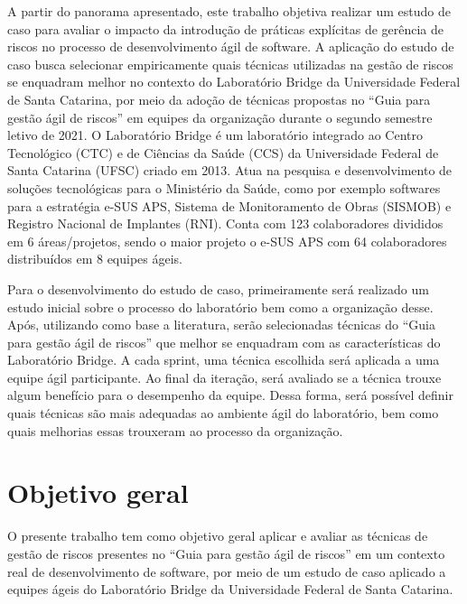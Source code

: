 \documentclass[
    12pt,       %
    openright,      %
    twoside,      %
    a4paper,      %
    english,      %
    french,       %
    spanish,      %
    brazil,       %
    ]{abntex2}
\begin{document}
A partir do panorama apresentado, este trabalho objetiva realizar um estudo de caso para avaliar o impacto da introdução de práticas explícitas de gerência de riscos no processo de desenvolvimento ágil de software. A aplicação do estudo de caso busca selecionar empiricamente quais técnicas utilizadas na gestão de riscos se enquadram melhor no contexto do Laboratório Bridge da Universidade Federal de Santa Catarina, por meio da adoção de técnicas propostas no “Guia para gestão ágil de riscos” \cite{Vieira:2020} em equipes da organização durante o segundo semestre letivo de 2021. O Laboratório Bridge é um laboratório integrado ao Centro Tecnológico (CTC) e de Ciências da Saúde (CCS) da Universidade Federal de Santa Catarina (UFSC) criado em 2013. Atua na pesquisa e desenvolvimento de soluções tecnológicas para o Ministério da Saúde, como por exemplo softwares para a estratégia e-SUS APS, Sistema de Monitoramento de Obras (SISMOB) e Registro Nacional de Implantes (RNI). Conta com 123 colaboradores divididos em 6 áreas/projetos, sendo o maior projeto o e-SUS APS com 64 colaboradores distribuídos em 8 equipes ágeis.

Para o desenvolvimento do estudo de caso, primeiramente será realizado um estudo inicial sobre o processo do laboratório bem como a organização desse. Após, utilizando como base a literatura, serão selecionadas técnicas do “Guia para gestão ágil de riscos” \cite{Vieira:2020} que melhor se enquadram com as características do Laboratório Bridge. A cada sprint, uma técnica escolhida será aplicada a uma equipe ágil participante. Ao final da iteração, será avaliado se a técnica trouxe algum benefício para o desempenho da equipe. Dessa forma, será possível definir quais técnicas são mais adequadas ao ambiente ágil do laboratório, bem como quais melhorias essas trouxeram ao processo da organização.

\section{Objetivo geral}

O presente trabalho tem como objetivo geral aplicar e avaliar as técnicas de gestão de riscos presentes no “Guia para gestão ágil de riscos” \cite{Vieira:2020} em um contexto real de desenvolvimento de software, por meio de um estudo de caso aplicado a equipes ágeis do Laboratório Bridge da Universidade Federal de Santa Catarina.
\end{document}
